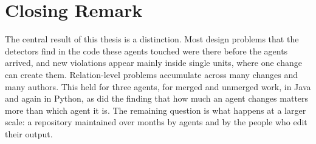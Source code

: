 \section{Closing Remark}
\label{sec:ch5-closing}

The central result of this thesis is a distinction. Most design problems that the detectors find in
the code these agents touched were there before the agents arrived, and new violations appear mainly
inside single units, where one change can create them. Relation-level problems accumulate across many
changes and many authors. This held for three agents, for merged and unmerged work, in Java and again
in Python, as did the finding that how much an agent changes matters more than which agent it is. The
remaining question is what happens at a larger scale: a repository maintained over months by agents
and by the people who edit their output.
